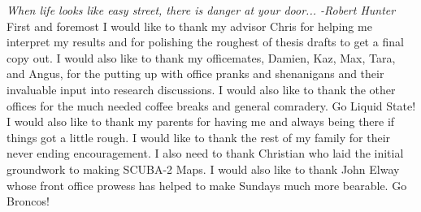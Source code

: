 
\newcommand{\firstname}{Jonathan}
\newcommand{\middlename}{H.}
\newcommand{\lastname}{Newton}
\newcommand{\degrees}{B.A.}
\newcommand{\thetitle}{Dust and Gas in NGC3627 Using Observations from SCUBA-2}
\newcommand{\halftitle}{Dust and Gas in NGC3627}
\newcommand{\thedegree}{Master of Science}
\newcommand{\shortdegree}{M.Sc.}
\newcommand{\currentmonth}{August}
\newcommand{\currentyear}{2014}
\newcommand{\department}{Physics and Astronomy}
\newcommand{\shortdepartment}{Physics and Astronomy}
\newcommand{\theuniversity}{McMaster University}
\newcommand{\bindingyear}{2014}
\newcommand{\submissionyear}{2014}
\newcommand{\submissionmonth}{August}
\newcommand{\supervisor}{Christine D. Wilson}
\newcommand{\thelocation}{Hamilton, Ontario}
\newcommand{\degreefrom}{Western Kentucky University}


\newcommand{\firstpages}{\pageref{frontmatterpages}}
\newcommand{\lastpages}{\pageref{finalpage}}


\halftitlepage
\thesistitle
\descriptivenotes

\begin{abstract} 



\end{abstract}




\dedication{To my family and Poly.}
\begin{acknowledgement}

\textit{When life looks like easy street, there is danger at your door... -Robert Hunter}\\

First and foremost I would like to thank my advisor Chris for helping me interpret my results and for polishing the roughest of thesis drafts to get a final copy out.  I would also like to thank my officemates, Damien, Kaz, Max, Tara, and Angus, for the putting up with office pranks and shenanigans and their invaluable input into research discussions.  I would also like to thank the other offices for the much needed coffee breaks and general comradery. Go Liquid State!  I would also like to thank my parents for having me and always being there if things got a little rough.  I would like to thank the rest of my family for their never ending encouragement.  I also need to thank Christian who laid the initial groundwork to making SCUBA-2 Maps.  I would also like to thank John Elway whose front office prowess has helped to make Sundays much more bearable.  Go Broncos!

\end{acknowledgement}

\tableofcontents
\listoffigures
\listoftables
